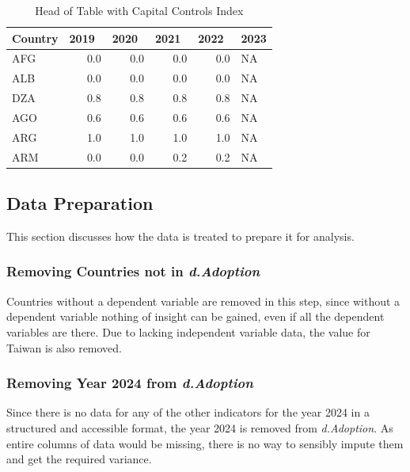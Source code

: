 \documentclass[
]{article}
\begin{document}
\begin{table}

\caption{\label{tab:tbl-ind-head-CC}Head of Table with Capital Controls Index}
\centering
\begin{tabular}[t]{l|r|r|r|r|l}
\hline
Country & 2019  & 2020  & 2021  & 2022  & 2023\\
\hline
AFG & 0.0 & 0.0 & 0.0 & 0.0 & NA\\
\hline
ALB & 0.0 & 0.0 & 0.0 & 0.0 & NA\\
\hline
DZA & 0.8 & 0.8 & 0.8 & 0.8 & NA\\
\hline
AGO & 0.6 & 0.6 & 0.6 & 0.6 & NA\\
\hline
ARG & 1.0 & 1.0 & 1.0 & 1.0 & NA\\
\hline
ARM & 0.0 & 0.0 & 0.2 & 0.2 & NA\\
\hline
\end{tabular}
\end{table}

\subsection{Data Preparation}\label{data-preparation}

This section discusses how the data is treated to prepare it for analysis.

\subsubsection{\texorpdfstring{Removing Countries not in \emph{d.Adoption}}{Removing Countries not in d.Adoption}}\label{removing-countries-not-in-d.adoption}

Countries without a dependent variable are removed in this step, since without a dependent variable nothing of insight can be gained, even if all the dependent variables are there. Due to lacking independent variable data, the value for Taiwan is also removed.

\subsubsection{\texorpdfstring{Removing Year 2024 from \emph{d.Adoption}}{Removing Year 2024 from d.Adoption}}\label{removing-year-2024-from-d.adoption}

Since there is no data for any of the other indicators for the year 2024 in a structured and accessible format, the year 2024 is removed from \emph{d.Adoption}. As entire columns of data would be missing, there is no way to sensibly impute them and get the required variance.
\end{document}
